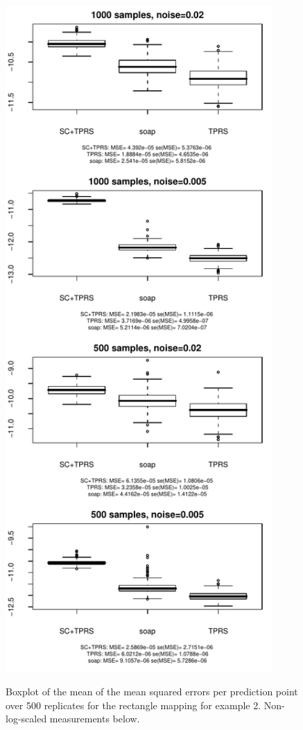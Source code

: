 \documentclass[a4paper,10pt]{amsart}
\begin{document}
\begin{figure}[p]
\centering
\includegraphics[width=4in]{figs-otherdomains/wigglytop-boxplot.pdf} \\
\caption{Boxplot of the mean of the mean squared errors per prediction point over 500 replicates for the rectangle mapping for example 2. Non-log-scaled measurements below.}
\label{wigglytop-boxplots}
\end{figure}
\end{document}
